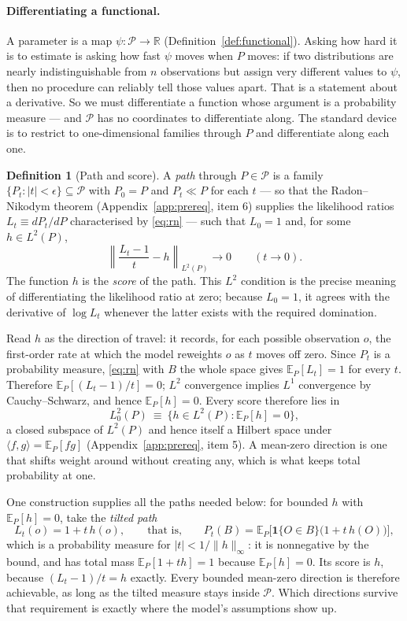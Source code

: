 \documentclass[11pt,a4paper]{article}
\theoremstyle{plain}
\theoremstyle{definition}
\newtheorem{definition}[theorem]{Definition}
\theoremstyle{remark}
\newcommand{\E}{\mathbb E}
\newcommand{\one}[1]{\mathbf 1\{#1\}}
\begin{document}
\paragraph{Differentiating a functional.}
A parameter is a map $\psi:\mathcal P\to\mathbb R$ (Definition~\ref{def:functional}). Asking how
hard it is to estimate is asking how fast $\psi$ moves when $P$ moves: if two distributions are
nearly indistinguishable from $n$ observations but assign very different values to $\psi$, then
no procedure can reliably tell those values apart. That is a statement about a derivative. So we
must differentiate a function whose argument is a probability measure --- and $\mathcal P$ has
no coordinates to differentiate along. The standard device is to restrict to one-dimensional
families through $P$ and differentiate along each one.

\begin{definition}[Path and score]\label{def:path}
A \emph{path} through $P\in\mathcal P$ is a family $\{P_t:|t|<\epsilon\}\subseteq\mathcal P$ with
$P_0=P$ and $P_t\ll P$ for each $t$ --- so that the Radon--Nikodym theorem
(Appendix~\ref{app:prereq}, item 6) supplies the likelihood ratios $L_t\equiv dP_t/dP$
characterised by \eqref{eq:rn} --- such that $L_0=1$ and, for some $h\in L^2(P)$,
\[
\left\|\frac{L_t-1}{t}-h\right\|_{L^2(P)}\longrightarrow0
\qquad (t\to0).
\]
The function $h$ is the \emph{score} of the path. This $L^2$ condition is the precise meaning
of differentiating the likelihood ratio at zero; because $L_0=1$, it agrees with the derivative
of $\log L_t$ whenever the latter exists with the required domination.
\end{definition}

Read $h$ as the direction of travel: it records, for each possible observation $o$, the
first-order rate at which the model reweights $o$ as $t$ moves off zero. Since $P_t$ is a
probability measure, \eqref{eq:rn} with $B$ the whole space gives $\E_P[L_t]=1$ for every $t$.
Therefore $\E_P[(L_t-1)/t]=0$; $L^2$ convergence implies $L^1$ convergence by
Cauchy--Schwarz, and hence $\E_P[h]=0$. Every score therefore lies in
\[
L^2_0(P)\ \equiv\ \bigl\{h\in L^2(P):\E_P[h]=0\bigr\},
\]
a closed subspace of $L^2(P)$ and hence itself a Hilbert space under
$\langle f,g\rangle=\E_P[fg]$ (Appendix~\ref{app:prereq}, item 5). A mean-zero direction is one
that shifts weight around without creating any, which is what keeps total probability at one.

One construction supplies all the paths needed below: for bounded $h$ with $\E_P[h]=0$, take the
\emph{tilted path}
\begin{equation}
L_t(o)=1+t\,h(o),
\qquad\text{that is,}\qquad
P_t(B)=\E_P\bigl[\one{O\in B}\bigl(1+t\,h(O)\bigr)\bigr],
\label{eq:tiltpath}
\end{equation}
which is a probability measure for $|t|<1/\|h\|_\infty$: it is nonnegative by the bound, and has
total mass $\E_P[1+th]=1$ because $\E_P[h]=0$. Its score is $h$, because
$(L_t-1)/t=h$ exactly. Every bounded mean-zero direction is therefore achievable, as
long as the tilted measure stays inside $\mathcal P$. Which directions survive that requirement
is exactly where the model's assumptions show up.
\end{document}
